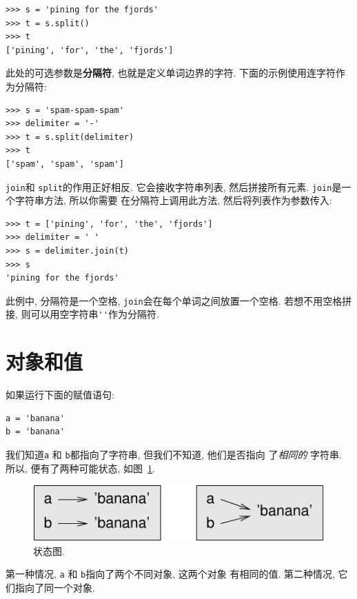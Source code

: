 \documentclass[10pt]{book}
\begin{document}
\begin{verbatim}
>>> s = 'pining for the fjords'
>>> t = s.split()
>>> t
['pining', 'for', 'the', 'fjords']
\end{verbatim}
%
此处的可选参数是{\bf 分隔符}, 也就是定义单词边界的字符. 
下面的示例使用连字符作为分隔符:

\begin{verbatim}
>>> s = 'spam-spam-spam'
>>> delimiter = '-'
>>> t = s.split(delimiter)
>>> t
['spam', 'spam', 'spam']
\end{verbatim}
%
{\tt join}和 {\tt split}的作用正好相反. 
它会接收字符串列表, 然后拼接所有元素. 
{\tt join}是一个字符串方法, 所以你需要
在分隔符上调用此方法, 然后将列表作为参数传入:

\begin{verbatim}
>>> t = ['pining', 'for', 'the', 'fjords']
>>> delimiter = ' '
>>> s = delimiter.join(t)
>>> s
'pining for the fjords'
\end{verbatim}
%
此例中, 分隔符是一个空格, 
{\tt join}会在每个单词之间放置一个空格. 
若想不用空格拼接, 则可以用空字符串\verb"''"作为分隔符. 


\section{对象和值}
\label{equivalence}

如果运行下面的赋值语句:

\begin{verbatim}
a = 'banana'
b = 'banana'
\end{verbatim}
%
我们知道{\tt a} 和 {\tt b}都指向了字符串, 但我们不知道, 他们是否指向
了{\em 相同的} 字符串. 
所以, 便有了两种可能状态, 如图~\ref{fig.list1}.

\begin{figure}
\centerline
{\includegraphics[scale=0.8]{figs/list1.pdf}}
\caption{状态图.}
\label{fig.list1}
\end{figure}

第一种情况, {\tt a} 和 {\tt b}指向了两个不同对象, 这两个对象
有相同的值. 第二种情况, 它们指向了同一个对象. 
\end{document}
